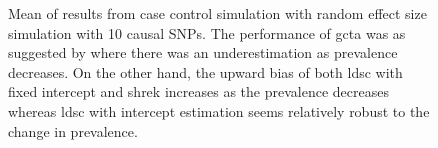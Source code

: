 \begin{figure}
{					
					\label{fig:ldscInCC10RandMean}
				}
				\caption[Mean of Case Control Simulation Results (10 Causal)]
				{Mean of results from case control simulation with random effect size simulation with 10 causal \glspl{SNP}.
					The performance of \gls{gcta} was as suggested by \citet{Golan2014} where there was an underestimation as prevalence decreases.
					On the other hand, the upward bias of both \gls{ldsc} with fixed intercept and \gls{shrek} increases as the prevalence decreases whereas \gls{ldsc} with intercept estimation seems relatively robust to the change in prevalence.
				} 
				\label{fig:CC10RandMean}
			\end{figure}
